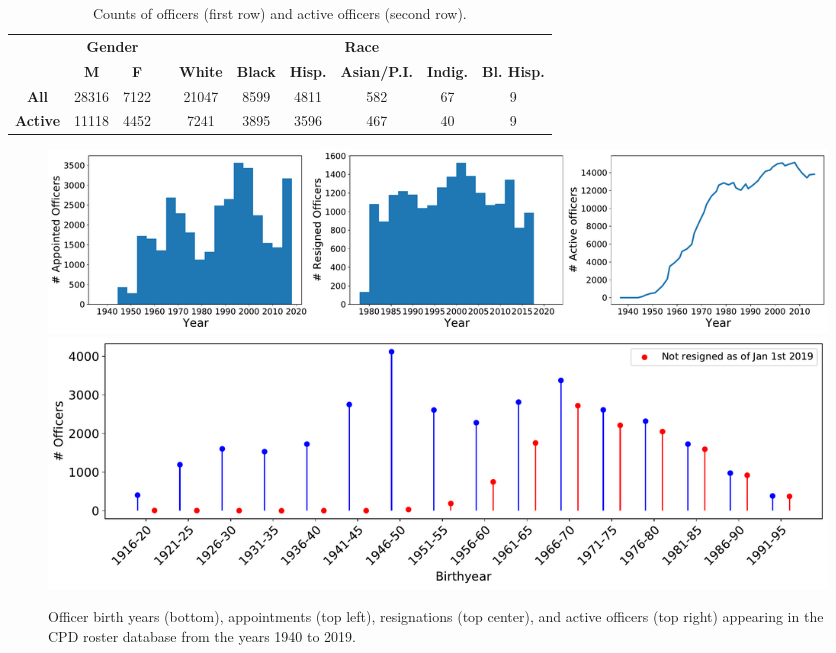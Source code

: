 \begin{table}[t!]
\caption{Counts of officers (first row) and active officers (second row). 
} \label{tab:stats}
\begin{tabular}{l|c|c|c|c|c|c|c|c|c|}
\cline{2-3} \cline{5-10}
                                               & \multicolumn{2}{c|}{\textbf{Gender}} & \multicolumn{1}{l|}{} & \multicolumn{6}{c|}{\textbf{Race}}                                                                                                                                                   \\ \cline{2-3} \cline{5-10} 
                                               & {\textbf{M}}   & {\textbf{F}}   &                       & {\textbf{White}} & {\textbf{Black}} & \multicolumn{1}{l|}{{\textbf{Hisp.}}} & {\textbf{Asian/P.I.}} & \multicolumn{1}{l|}{{\textbf{Indig.}}} & {\textbf{Bl. Hisp.}} \\ \cline{1-3} \cline{5-10} 
\multicolumn{1}{|c|}{\textbf{All}}    & 28316                 & 7122                  &                       & 21047                   & 8599                    & 4811                                         & 582                     & 67                                              & 9                           \\ \cline{1-3} \cline{5-10} 
\multicolumn{1}{|c|}{\textbf{Active}} & 11118                 & 4452                  &                       & 7241                    & 3895                    & 3596                                         & 467                     & 40                                              & 9                           \\ \cline{1-3} \cline{5-10} 
\end{tabular} 
\end{table}


\begin{figure}[t!] 
\includegraphics[width=\textwidth]{figs/history} 
\includegraphics[width=\textwidth]{figs/history_by} 
\caption{Officer birth years (bottom), appointments (top left), resignations (top center), and active
officers (top right) appearing in the CPD roster database from the years 1940 to 2019.}
\label{fig:history}
\end{figure}

